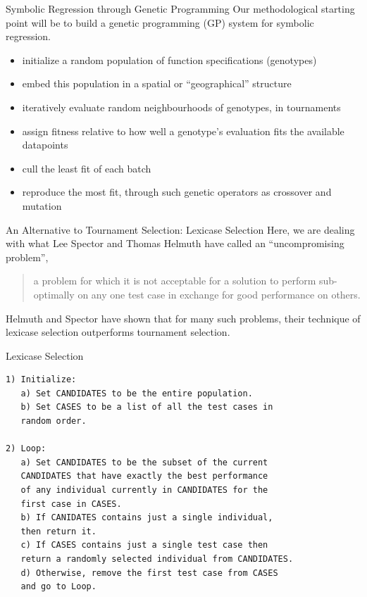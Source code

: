 \documentclass[presentation]{beamer}
\begin{document}
\begin{frame}[label={sec:orgba15751}]{Symbolic Regression through Genetic Programming}
Our methodological starting point will be to build a genetic programming (GP) system for symbolic regression.

\begin{itemize}
\item initialize a random population of function specifications (\alert{genotypes})
\item embed this population in a spatial or ``\alert{geographical}'' structure
\item iteratively evaluate random neighbourhoods of genotypes, in \alert{tournaments}
\item assign \alert{fitness} relative to how well a genotype's evaluation fits the available datapoints
\item cull the least fit of each batch
\item reproduce the most fit, through such \alert{genetic operators} as crossover and mutation
\end{itemize}
\end{frame}

\begin{frame}[label={sec:org5dd13c3}]{An Alternative to Tournament Selection: Lexicase Selection}
Here, we are dealing with what Lee Spector and Thomas Helmuth have called an ``uncompromising problem'',

\begin{quote}
a problem for which it is not acceptable for a solution to perform sub-optimally on any one test case in exchange for good performance on others.
\end{quote}

Helmuth and Spector have shown that for many such problems, their technique of \alert{lexicase selection} outperforms \alert{tournament selection}.
\end{frame}

\begin{frame}[label={sec:org8b6ee2a},fragile]{Lexicase Selection}
 \begin{verbatim}
1) Initialize:
   a) Set CANDIDATES to be the entire population.
   b) Set CASES to be a list of all the test cases in
   random order.

2) Loop:
   a) Set CANDIDATES to be the subset of the current
   CANDIDATES that have exactly the best performance
   of any individual currently in CANDIDATES for the
   first case in CASES.
   b) If CANIDATES contains just a single individual,
   then return it.
   c) If CASES contains just a single test case then
   return a randomly selected individual from CANDIDATES.
   d) Otherwise, remove the first test case from CASES
   and go to Loop.
\end{verbatim}
\end{frame}
\end{document}
